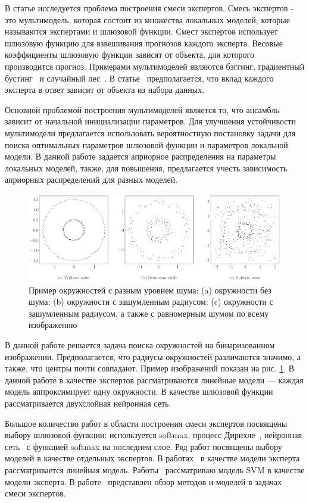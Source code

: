В статье исследуется проблема построения смеси экспертов.
Смесь экспертов - это мультимодель, которая состоит из множества локальных моделей, которые называются экспертами и шлюзовой функции.
Смест экспертов использует шлюзовую функцию для взвешивания прогнозов каждого эксперта.
Весовые коэффициенты шлюзовую функции зависят от объекта, для которого производится прогноз.
Примерами мультимоделей являются бэггинг,  градиентный бустинг~\cite{Tianqi2016} и случайный лес~\cite{Ishwaran2012}.
В статье~\cite{Yuksel2012} предполагается, что вклад каждого эксперта в ответ зависит от объекта из набора данных.

Основной проблемой построения мультимоделей является то, что ансамбль зависит от начальной инициализации параметров. Для улучшения устойчивости мультимодели предлагается использовать вероятностную постановку задачи для поиска оптимальных параметров шлюзовой функции и параметров локальной модели. В данной работе задается априорное распределения на параметры локальных моделей, также, для повышения, предлагается учесть зависимость априорных распределений для разных моделей.

\begin{figure}[h!t]\center
\includegraphics[width=1\textwidth]{results/priorexpert/statment}
\caption{Пример окружностей с разным уровнем шума: (a) окружности без шума; (b) окружности с зашумленным радиусом; (c) окружности с зашумленным радиусом, а также с равномерным шумом по всему изображению}
\label{example:1}
\end{figure}

В данной работе решается задача поиска окружностей на бинаризованном изображении. Предполагается, что радиусы окружностей различаются значимо, а также, что центры почти совпадают. Пример изображений показан на рис. \ref{example:1}. В данной работе в качестве экспертов рассматриваются линейные модели --- каждая модель аппроксимирует одну окружности. В качестве шлюзовой функции рассматривается двухслойная нейронная сеть.

Большое количество работ в области построения смеси экспертов посвящены выбору шлюзовой функции: используется softmax, процесс Дирихле~\cite{Edward2002}, нейронная сеть~\cite{Shazeer2017} с функцией softmax на последнем слое. Ряд работ посвящены выбору моделей в качестве отдельных экспертов. В работах~\cite{Jordan1994, Jordan1991} в качестве модели эксперта рассматривается линейная модель. Работы~\cite{Lima2007, Cao2003} рассматриваю модель SVM в качестве модели эксперта.
В работе~\cite{Yuksel2012} представлен обзор методов и моделей в задачах смеси экспертов.


